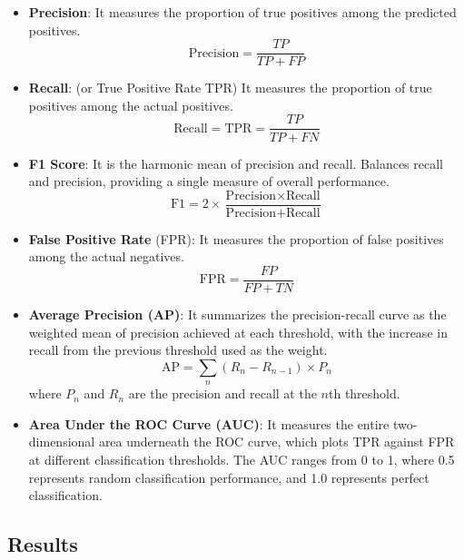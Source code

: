 \documentclass[preprint,12pt]{elsarticle}
\theoremstyle{plain}
\theoremstyle{definition}
\theoremstyle{remark}
\begin{document}
\begin{itemize}
    \item \textbf{Precision}: It measures the proportion of true positives among the predicted positives. \[\text{Precision} = \frac{TP}{TP + FP}\]
    \item \textbf{Recall}: (or True Positive Rate TPR) It measures the proportion of true positives among the actual positives. \[\text{Recall} = \text{TPR} = \frac{TP}{TP + FN}\]
    \item \textbf{F1 Score}: It is the harmonic mean of precision and recall. Balances recall and precision, providing a single measure of overall performance. \[\text{F1} = 2 \times \frac{\text{Precision} \times \text{Recall}}{\text{Precision} + \text{Recall}}\]
    \item \textbf{False Positive Rate} (FPR): It measures the proportion of false positives among the actual negatives. \[\text{FPR} = \frac{FP}{FP + TN}\]
    \item \textbf{Average Precision (AP)}: It summarizes the precision-recall curve as the weighted mean of precision achieved at each threshold, with the increase in recall from the previous threshold used as the weight.
    \[\text{AP} = \sum_{n} (R_n - R_{n-1}) \times P_n\]
    where $P_n$ and $R_n$ are the precision and recall at the $n$th threshold.
    \item \textbf{Area Under the ROC Curve (AUC)}: It measures the entire two-dimensional area underneath the ROC curve, which plots TPR against FPR at different classification thresholds.
    The AUC ranges from 0 to 1, where 0.5 represents random classification performance, and 1.0 represents perfect classification.
\end{itemize}

\subsection{Results}
\end{document}
